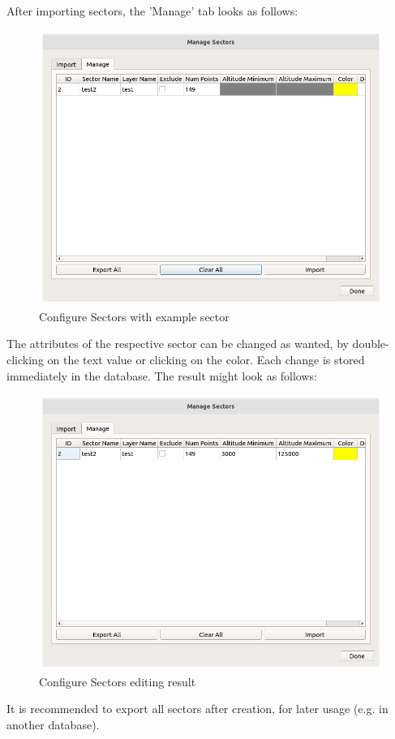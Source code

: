 After importing sectors, the 'Manage' tab looks as follows:

\begin{figure}[H]
    \includegraphics[width=15cm]{figures/configure_sectors_manage2.png}
  \caption{Configure Sectors with example sector}
\end{figure}

The attributes of the respective sector can be changed as wanted, by double-clicking on the text value or clicking on the color. Each change is stored immediately in the database. The result might look as follows:\\

\begin{figure}[H]
    \includegraphics[width=15cm]{figures/configure_sectors_done.png}
  \caption{Configure Sectors editing result}
\end{figure}

It is recommended to export all sectors after creation, for later usage (e.g. in another database).
